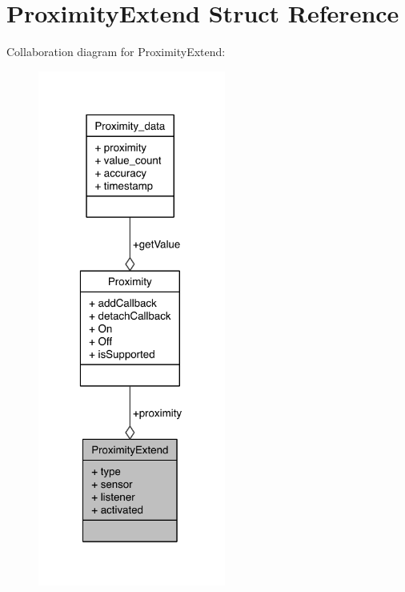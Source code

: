 \section{Proximity\-Extend Struct Reference}
\label{structProximityExtend}


Collaboration diagram for Proximity\-Extend\-:
\nopagebreak
\begin{figure}[H]
\begin{center}
\leavevmode
\includegraphics[width=175pt]{structProximityExtend__coll__graph}
\end{center}
\end{figure}
